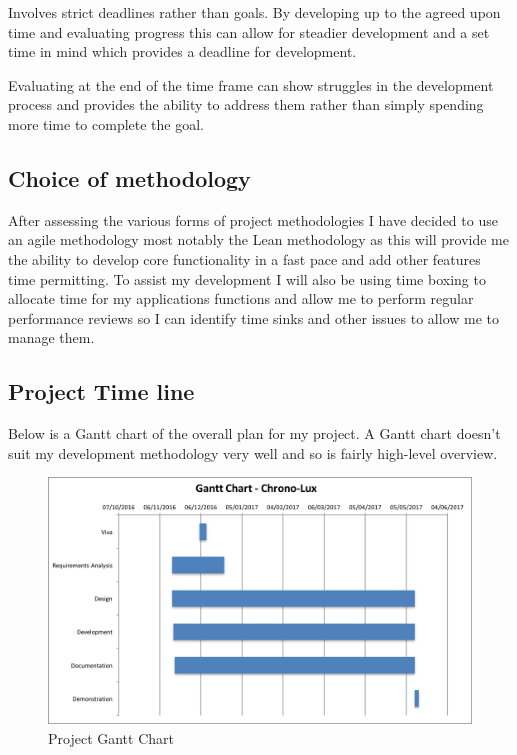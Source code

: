 Involves strict deadlines rather than goals. By developing up to the
agreed upon time and evaluating progress this can allow for steadier
development and a set time in mind which provides a deadline for
development.

Evaluating at the end of the time frame can show struggles in the
development process and provides the ability to address them rather than
simply spending more time to complete the goal.

\subsection{Choice of methodology}\label{choice-of-methodology}

After assessing the various forms of project methodologies I have
decided to use an agile methodology most notably the Lean methodology as
this will provide me the ability to develop core functionality in a fast
pace and add other features time permitting. To assist my development I
will also be using time boxing to allocate time for my applications
functions and allow me to perform regular performance reviews so I can
identify time sinks and other issues to allow me to manage them.

\subsection{Project Time line}\label{project-time-line}

Below is a Gantt chart of the overall plan for my project. A Gantt chart
doesn't suit my development methodology very well and so is fairly
high-level overview.

\begin{landscape}
\begin{figure}[htbp]
\includegraphics{Images/gantt.png}
\caption{Project Gantt Chart}
\end{figure}
\end{landscape}
